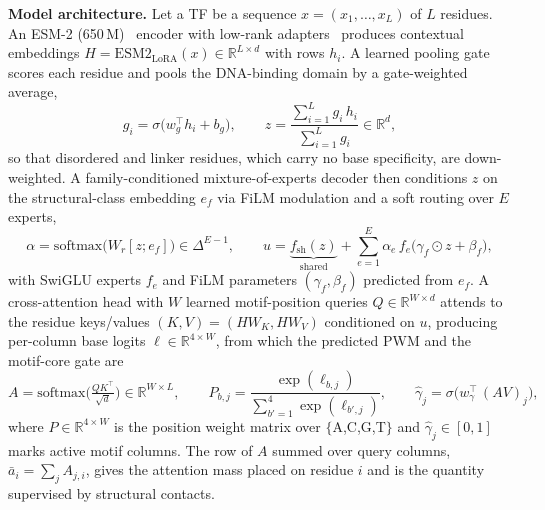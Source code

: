 \documentclass[11pt,letterpaper]{article}
\begin{document}
\noindent\textbf{Model architecture.} Let a TF be a sequence $x=(x_1,\dots,x_L)$ of $L$ residues.
An ESM-2 (650\,M)~\cite{Lin2023} encoder with low-rank adapters~\cite{Hu2022} produces contextual
embeddings $H=\mathrm{ESM2}_{\mathrm{LoRA}}(x)\in\mathbb{R}^{L\times d}$ with rows $h_i$. A learned
pooling gate scores each residue and pools the DNA-binding domain by a gate-weighted average,
\begin{equation}
g_i=\sigma\!\big(w_g^{\top}h_i+b_g\big),\qquad
z=\frac{\sum_{i=1}^{L} g_i\,h_i}{\sum_{i=1}^{L} g_i}\in\mathbb{R}^{d},
\end{equation}
so that disordered and linker residues, which carry no base specificity, are down-weighted. A
family-conditioned mixture-of-experts decoder then conditions $z$ on the structural-class embedding
$e_f$ via FiLM modulation and a soft routing over $E$ experts,
\begin{equation}
\alpha=\mathrm{softmax}\!\big(W_r[z;e_f]\big)\in\Delta^{E-1},\qquad
u=\underbrace{f_{\mathrm{sh}}(z)}_{\text{shared}}+\sum_{e=1}^{E}\alpha_e\,f_e\!\big(\gamma_f\odot z+\beta_f\big),
\end{equation}
with SwiGLU experts $f_e$ and FiLM parameters $(\gamma_f,\beta_f)$ predicted from $e_f$. A
cross-attention head with $W$ learned motif-position queries $Q\in\mathbb{R}^{W\times d}$ attends to
the residue keys/values $(K,V)=(HW_K,HW_V)$ conditioned on $u$, producing per-column base logits
$\ell\in\mathbb{R}^{4\times W}$, from which the predicted PWM and the motif-core gate are
\begin{equation}
A=\mathrm{softmax}\!\Big(\tfrac{QK^{\top}}{\sqrt{d}}\Big)\in\mathbb{R}^{W\times L},\qquad
P_{b,j}=\frac{\exp(\ell_{b,j})}{\sum_{b'=1}^{4}\exp(\ell_{b',j})},\qquad
\hat{\gamma}_j=\sigma\!\big(w_\gamma^{\top}\,(AV)_j\big),
\end{equation}
where $P\in\mathbb{R}^{4\times W}$ is the position weight matrix over $\{$A,C,G,T$\}$ and
$\hat\gamma_j\in[0,1]$ marks active motif columns. The row of $A$ summed over query columns,
$\bar a_i=\sum_j A_{j,i}$, gives the attention mass placed on residue $i$ and is the quantity
supervised by structural contacts.
\end{document}
